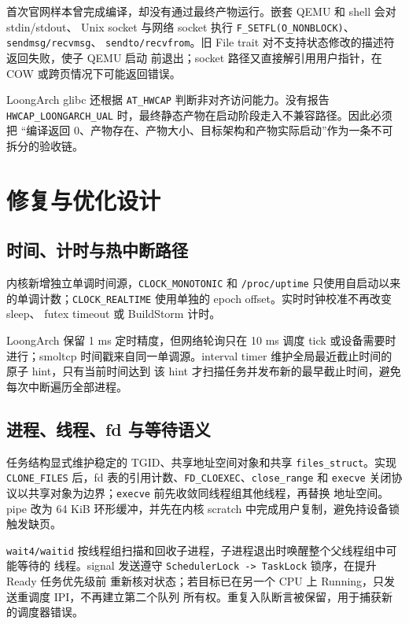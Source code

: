 \documentclass[UTF8,zihao=-4]{ctexart}
\newcommand{\code}{\nolinkurl}
\begin{document}
首次官网样本曾完成编译，却没有通过最终产物运行。嵌套 QEMU 和 shell 会对 stdin/stdout、
Unix socket 与网络 socket 执行 \code{F_SETFL(O_NONBLOCK)}、\code{sendmsg/recvmsg}、
\code{sendto/recvfrom}。旧 File trait 对不支持状态修改的描述符返回失败，使子 QEMU 启动
前退出；socket 路径又直接解引用用户指针，在 COW 或跨页情况下可能返回错误。

LoongArch glibc 还根据 \code{AT_HWCAP} 判断非对齐访问能力。没有报告
\code{HWCAP_LOONGARCH_UAL} 时，最终静态产物在启动阶段走入不兼容路径。因此必须把
“编译返回 0、产物存在、产物大小、目标架构和产物实际启动”作为一条不可拆分的验收链。

\section{修复与优化设计}
\label{sec:design}

\subsection{时间、计时与热中断路径}

内核新增独立单调时间源，\code{CLOCK_MONOTONIC} 和 \code{/proc/uptime} 只使用自启动以来
的单调计数；\code{CLOCK_REALTIME} 使用单独的 epoch offset。实时时钟校准不再改变 sleep、
futex timeout 或 BuildStorm 计时。

LoongArch 保留 1 ms 定时精度，但网络轮询只在 10 ms 调度 tick 或设备需要时进行；smoltcp
时间戳来自同一单调源。interval timer 维护全局最近截止时间的原子 hint，只有当前时间达到
该 hint 才扫描任务并发布新的最早截止时间，避免每次中断遍历全部进程。

\subsection{进程、线程、fd 与等待语义}

任务结构显式维护稳定的 TGID、共享地址空间对象和共享 \code{files_struct}。实现
\code{CLONE_FILES} 后，fd 表的引用计数、\code{FD_CLOEXEC}、\code{close_range} 和
\code{execve} 关闭协议以共享对象为边界；\code{execve} 前先收敛同线程组其他线程，再替换
地址空间。pipe 改为 64 KiB 环形缓冲，并先在内核 scratch 中完成用户复制，避免持设备锁
触发缺页。

\code{wait4/waitid} 按线程组扫描和回收子进程，子进程退出时唤醒整个父线程组中可能等待的
线程。signal 发送遵守 \code{SchedulerLock -> TaskLock} 锁序，在提升 Ready 任务优先级前
重新核对状态；若目标已在另一个 CPU 上 Running，只发送重调度 IPI，不再建立第二个队列
所有权。重复入队断言被保留，用于捕获新的调度器错误。
\end{document}
